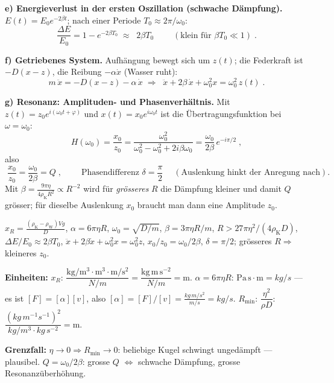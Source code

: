 \textbf{e) Energieverlust in der ersten Oszillation (schwache Dämpfung).}
$E(t)=E_0e^{-2\beta t}$; nach einer Periode $T_0\approx2\pi/\omega_0$:
\begin{equation}
  \frac{\Delta E}{E_0}=1-e^{-2\beta T_0}
  \;\approx\;\boxed{\;2\beta T_0\;}
  \qquad(\text{klein für } \beta T_0\ll1)\;.
\end{equation}

\textbf{f) Getriebenes System.} Aufhängung bewegt sich um $z(t)$; die
Federkraft ist $-D(x-z)$, die Reibung $- \alpha\dot x$ (Wasser ruht):
\begin{equation}
  m\,\ddot x=-D(x-z)-\alpha\,\dot x
  \;\Longrightarrow\;
  \boxed{\;\ddot x+2\beta\,\dot x+\omega_0^2 x=\omega_0^2\, z(t)\;}.
\end{equation}

\textbf{g) Resonanz: Amplituden- und Phasenverhältnis.} Mit $z(t)=z_0e^{i(\omega_0 t+\varphi)}$
und $x(t)=x_0e^{i\omega_0t}$ ist die Übertragungsfunktion bei $\omega=\omega_0$:
\begin{equation}
  H(\omega_0)=\frac{x_0}{z_0}=
  \frac{\omega_0^2}{\omega_0^2-\omega_0^2+2i\beta\omega_0}
  =\frac{\omega_0}{2\beta}\,e^{-i\pi/2}\;,
\end{equation}
also
\begin{equation}
  \boxed{\;\frac{x_0}{z_0}=\frac{\omega_0}{2\beta}=Q\;},\qquad
  \boxed{\;\text{Phasendifferenz }\delta=\frac{\pi}{2}\;}
  \quad(\text{Auslenkung hinkt der Anregung nach}).
\end{equation}
Mit $\beta=\frac{9\pi\eta}{4\rho_{\mathrm K}R^2}\propto R^{-2}$ wird für
\emph{grösseres} $R$ die Dämpfung kleiner und damit $Q$ grösser; für dieselbe
Auslenkung $x_0$ braucht man dann eine  Amplitude $z_0$.

\begin{ergebnis}
$x_R=\frac{(\rho_{\mathrm K}-\rho_{\mathrm W})Vg}{D}$, $\alpha=6\pi\eta R$,
$\omega_0=\sqrt{D/m}$, $\beta=3\pi\eta R/m$,
$R>27\pi\eta^2/(4\rho_{\mathrm K}D)$,
$\Delta E/E_0\approx2\beta T_0$,
$\ddot x+2\beta\dot x+\omega_0^2x=\omega_0^2 z$,
$x_0/z_0=\omega_0/2\beta$, $\delta=\pi/2$; grösseres $R\Rightarrow$ kleineres $z_0$.
\end{ergebnis}

\begin{kontrolle}
\textbf{Einheiten:} $x_R$: $\dfrac{\mathrm{kg/m^3\cdot m^3\cdot m/s^2}}{N/m}=\dfrac{\mathrm{kg\,m\,s^{-2}}}{N/m}=\mathrm{m}$. \checkmark
$\alpha=6\pi\eta R$: $\mathrm{Pa\,s\cdot m}=kg/s$ --- es ist $[F]=[\alpha][v]$, also
$[\alpha]=[F]/[v]=\tfrac{kg\,m/s^2}{m/s}=kg/s$. \checkmark
$R_{\min}$: $\dfrac{\eta^2}{\rho D}$:
$\dfrac{(kg\,m^{-1}s^{-1})^2}{kg/m^3\cdot kg\,s^{-2}}=\mathrm m$. \checkmark

\textbf{Grenzfall:} $\eta\to0\Rightarrow R_{\min}\to0$: beliebige Kugel schwingt
ungedämpft --- plausibel. $Q=\omega_0/2\beta$: grosse $Q$ $\Leftrightarrow$
schwache Dämpfung, grosse Resonanzüberhöhung. \checkmark
\end{kontrolle}

